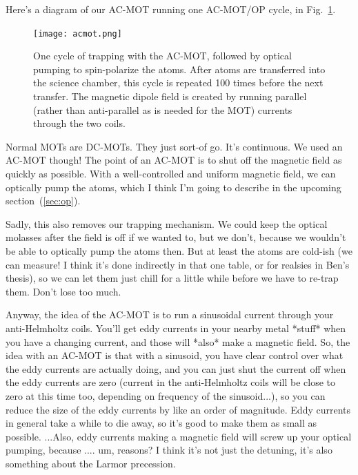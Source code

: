
Here's a diagram of our AC-MOT running one AC-MOT/OP cycle, in Fig.~\ref{fig:acmot}.

\begin{figure}[ht]
	\centering
		\texttt{[image: acmot.png]}
		\caption{One cycle of trapping with the AC-MOT, followed by optical pumping to spin-polarize the atoms.  After atoms are transferred into the science chamber, this cycle is repeated 100 times before the next transfer.  The magnetic dipole field is created by running parallel (rather than anti-parallel as is needed for the MOT) currents through the two coils.}
		\label{fig:acmot}
\end{figure}


Normal MOTs are DC-MOTs.  They just sort-of go.  It's continuous.  We used an AC-MOT though!  The point of an AC-MOT is to shut off the magnetic field as quickly as possible.  With a well-controlled and uniform magnetic field, we can optically pump the atoms, which I think I'm going to describe in the upcoming section~(\ref{sec:op}).

Sadly, this also removes our trapping mechanism.  We could keep the optical molasses after the field is off if we wanted to, but we don't, because we wouldn't be able to optically pump the atoms then.  But at least the atoms are cold-ish (we can measure!  I think it's done indirectly in that one table, or for realsies in Ben's thesis), so we can let them just chill for a little while before we have to re-trap them.  Don't lose too much.  

Anyway, the idea of the AC-MOT is to run a sinusoidal current through your anti-Helmholtz coils.  You'll get eddy currents in your nearby metal *stuff* when you have a changing current, and those will *also* make a magnetic field. So, the idea with an AC-MOT is that with a sinusoid, you have clear control over what the eddy currents are actually doing, and you can just shut the current off when the eddy currents are zero (current in the anti-Helmholtz coils will be close to zero at this time too, depending on frequency of the sinusoid...), so you can reduce the size of the eddy currents by like an order of magnitude.  Eddy currents in general take a while to die away, so it's good to make them as small as possible.  ...Also, eddy currents making a magnetic field will screw up your optical pumping, because .... um, reasons?  I think it's not just the detuning, it's also something about the Larmor precession.  

